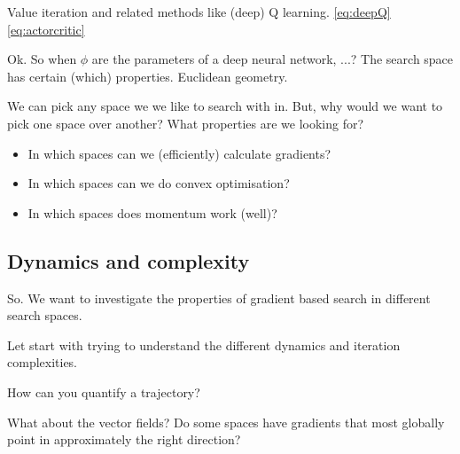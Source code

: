 Value iteration and related methods like (deep) Q learning. \eqref{eq:deepQ}
\eqref{eq:actorcritic}

Ok. So when $\phi$ are the parameters of a deep neural network, ...? The search space has certain (which) properties.
Euclidean geometry.


We can pick any space we we like to search with in. But, why would we want to pick one space over another?
What properties are we looking for?

\begin{itemize}
\tightlist
\item
  In which spaces can we (efficiently) calculate gradients?
\item
  In which spaces can we do convex optimisation?
\item
  In which spaces does momentum work (well)?
\end{itemize}


\subsection{Dynamics and complexity}

\begin{displayquote}
So. We want to investigate the properties of gradient based search in different search spaces.
\end{displayquote}

Let start with trying to understand the different dynamics and iteration complexities.

How can you quantify a trajectory?

What about the vector fields?
Do some spaces have gradients that most globally point in approximately the right direction?



